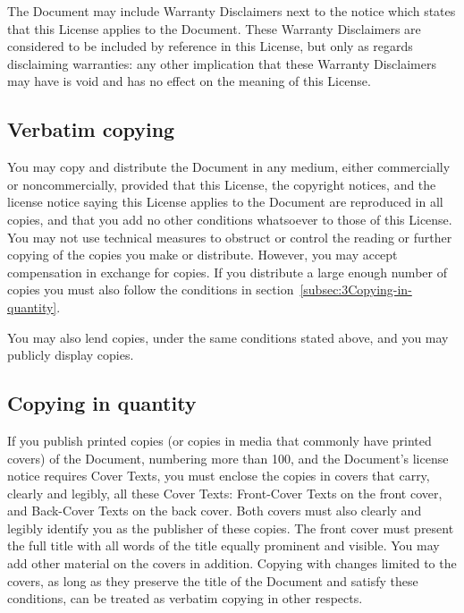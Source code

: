 {\tiny{}The Document may include Warranty Disclaimers next to the
notice which states that this License applies to the Document. These
Warranty Disclaimers are considered to be included by reference in
this License, but only as regards disclaiming warranties: any other
implication that these Warranty Disclaimers may have is void and has
no effect on the meaning of this License.}{\tiny\par}

\subsection{Verbatim copying\label{subsec:2Verbatim-copying}}

{\tiny{}You may copy and distribute the Document in any medium, either
commercially or noncommercially, provided that this License, the copyright
notices, and the license notice saying this License applies to the
Document are reproduced in all copies, and that you add no other conditions
whatsoever to those of this License. You may not use technical measures
to obstruct or control the reading or further copying of the copies
you make or distribute. However, you may accept compensation in exchange
for copies. If you distribute a large enough number of copies you
must also follow the conditions in section~\ref{subsec:3Copying-in-quantity}.}{\tiny\par}

{\tiny{}You may also lend copies, under the same conditions stated
above, and you may publicly display copies.}{\tiny\par}

\subsection{Copying in quantity\label{subsec:3Copying-in-quantity}}

{\tiny{}If you publish printed copies (or copies in media that commonly
have printed covers) of the Document, numbering more than 100, and
the Document's license notice requires Cover Texts, you must enclose
the copies in covers that carry, clearly and legibly, all these Cover
Texts: Front-Cover Texts on the front cover, and Back-Cover Texts
on the back cover. Both covers must also clearly and legibly identify
you as the publisher of these copies. The front cover must present
the full title with all words of the title equally prominent and visible.
You may add other material on the covers in addition. Copying with
changes limited to the covers, as long as they preserve the title
of the Document and satisfy these conditions, can be treated as verbatim
copying in other respects.}{\tiny\par}

